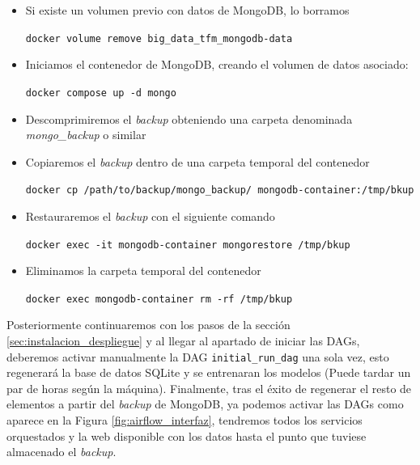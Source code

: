 \begin{itemize}

    \item Si existe un volumen previo con datos de MongoDB, lo borramos

    \texttt{docker volume remove big\_data\_tfm\_mongodb-data}
    
    \item Iniciamos el contenedor de MongoDB, creando el volumen de datos asociado:
    
    \texttt{docker compose up -d mongo}
    
    \item Descomprimiremos el \textit{backup} obteniendo una carpeta denominada \textit{mongo\_backup} o similar

    \item Copiaremos el \textit{backup} dentro de una carpeta temporal del contenedor

    \texttt{docker cp /path/to/backup/mongo\_backup/ mongodb-container:/tmp/bkup}

    \item Restauraremos el \textit{backup} con el siguiente comando

    \texttt{docker exec -it mongodb-container mongorestore /tmp/bkup}

    \item Eliminamos la carpeta temporal del contenedor

    \texttt{docker exec mongodb-container rm -rf /tmp/bkup}
    
    
\end{itemize}

Posteriormente continuaremos con los pasos de la sección \ref{sec:instalacion_despliegue} y al llegar al apartado de iniciar las DAGs, deberemos activar manualmente la DAG \texttt{initial\_run\_dag} una sola vez, esto regenerará la base de datos SQLite y se entrenaran los modelos (Puede tardar un par de horas según la máquina). Finalmente, tras el éxito de regenerar el resto de elementos a partir del \textit{backup} de MongoDB, ya podemos activar las DAGs como aparece en la Figura \ref{fig:airflow_interfaz}, tendremos todos los servicios orquestados y la web disponible con los datos hasta el punto que tuviese almacenado el \textit{backup}.
